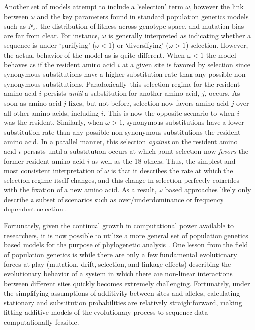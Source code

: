 \documentclass{article}
\newcommand{\Ne}{\ensuremath{{N_e}}\xspace} %
\begin{document}
Another set of models attempt to include a 'selection' term $\omega$, however the link between $\omega$ and the key parameters found in standard population genetics models such as \Ne, the distribution of fitness across genotype space, and mutation bias are far from clear.
For instance, $\omega$ is generally interpreted as indicating whether a sequence is under `purifying' ($\omega < 1$) or `diversifying' ($\omega > 1$) selection.
However, the actual behavior of the model as is quite different.
When $\omega < 1$ the model behaves as if the resident amino acid $i$ at a given site is favored by selection since synonymous substitutions have a higher substitution rate than any possible non-synonymous substitutions.
Paradoxically, this selection regime for the resident amino acid $i$ persists \emph{until} a substitution for another amino acid, $j$, occurs.
As soon as amino acid $j$ fixes, but not before, selection now favors amino acid $j$ over all other amino acids, including $i$.
This is now the opposite scenario to when $i$ was the resident.
Similarly, when $\omega > 1$, synonymous substitutions have a lower substitution rate than any possible non-synonymous substitutions the resident amino acid.
In a parallel manner, this selection \emph{against} on the resident amino acid $i$ persists until a substitution occurs at which point selection now \emph{favors}  the former resident amino acid $i$ as well as the 18 others.
Thus, the simplest and most consistent interpretation of $\omega$ is that it describes the rate at which the selection regime itself changes, and this change in selection perfectly coincides with the fixation of a new amino acid.
As a result, $\omega$ based approaches likely only describe a subset of scenarios such as over/underdominance or frequency dependent selection \citep{HughesAndNei1988,Nowak2006}.

Fortunately, given the continual growth in computational power available to researchers, it is now possible to utilize a more general set of population genetics based models for the purpose of phylogenetic analysis \citep[e.g.][]{HalpernAndBruno1998,RobinsonEtAl2003,LartillotAndPhilippe2004,RodrigueAndLartillot2014}.
One lesson from the field of population genetics is while there are only a few fundamental evolutionary forces at play (mutation, drift, selection, and linkage effects) describing the evolutionary behavior of a system in which there are non-linear interactions between different sites quickly becomes extremely challenging.
Fortunately, under the simplifying assumptions of additivity between sites and alleles, calculating stationary and substitution probabilities are relatively straightforward, making fitting additive models of the evolutionary process to sequence data computationally feasible.
\end{document}
